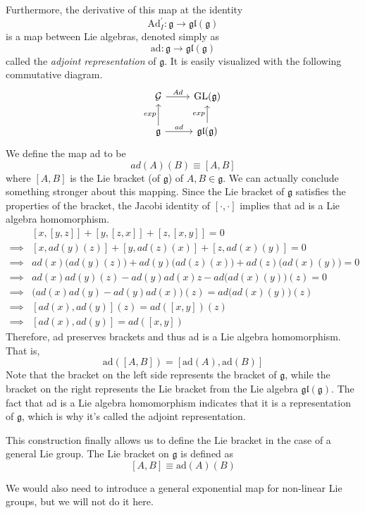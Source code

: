 \documentclass{article}
\DeclareMathOperator{\GL}{GL}
\begin{document}
    \begin{definition}
    Furthermore, the derivative of this map at the identity 
    \[\text{Ad}_I^\prime: \mathfrak{g} \longrightarrow \mathfrak{gl}(\mathfrak{g})\]
    is a map between Lie algebras, denoted simply as 
    \[\text{ad}: \mathfrak{g} \longrightarrow \mathfrak{gl}(\mathfrak{g})\]
    called the \textit{adjoint representation} of $\mathfrak{g}$. It is easily visualized with the following commutative diagram. 
    \[\begin{tikzcd}
    \mathcal{G} \arrow{r}{Ad} & \GL(\mathfrak{g}) \\
    \mathfrak{g} \arrow{u}{exp} \arrow{r}{ad} & \mathfrak{gl}(\mathfrak{g}) \arrow{u}{exp}
    \end{tikzcd}\]
    We define the map ad to be 
    \[ad(A)(B) \equiv [A,B]\]
    where $[A,B]$ is the Lie bracket (of $\mathfrak{g}$) of $A, B \in \mathfrak{g}$. We can actually conclude something stronger about this mapping. Since the Lie bracket of $\mathfrak{g}$ satisfies the properties of the bracket, the Jacobi identity of $[\cdot, \cdot]$ implies that ad is a Lie algebra homomorphism. 
    \begin{align*}
        & [x, [y,z]] + [y,[z,x]] + [z, [x,y]] = 0 \\
        \implies & [x, ad(y)(z)] + [y, ad(z)(x)] + [z, ad(x)(y)] = 0 \\
        \implies & ad(x)\big(ad(y)(z)\big) + ad(y) \big( ad(z)(x)\big) + ad(z) \big(ad(x)(y)\big) = 0 \\
        \implies & ad(x) ad(y) (z) - ad(y) ad(x) z - ad \big(ad(x)(y)\big) (z) = 0 \\
        \implies & \big( ad(x) ad(y) - ad(y) ad(x) \big) (z) = ad\big( ad(x)(y) \big) (z) \\
        \implies & [ad(x), ad(y)] (z) = ad ([x,y]) (z) \\
        \implies & [ad(x), ad(y)] = ad([x,y])
    \end{align*}
    Therefore, ad preserves brackets and thus ad is a Lie algebra homomorphism. That is, 
    \[\text{ad}([A,B]) = [\text{ad}(A), \text{ad}(B)]\]
    Note that the bracket on the left side represents the bracket of $\mathfrak{g}$, while the bracket on the right represents the Lie bracket from the Lie algebra $\mathfrak{gl}(\mathfrak{g})$. The fact that ad is a Lie algebra homomorphism indicates that it is a representation of $\mathfrak{g}$, which is why it's called the adjoint representation. 
    \end{definition}

    \begin{definition}
    This construction finally allows us to define the Lie bracket in the case of a general Lie group. The Lie bracket on $\mathfrak{g}$ is defined as 
    \[[A,B] \equiv \text{ad} (A) (B)\]
    \end{definition}

    We would also need to introduce a general exponential map for non-linear Lie groups, but we will not do it here. 
\end{document}
